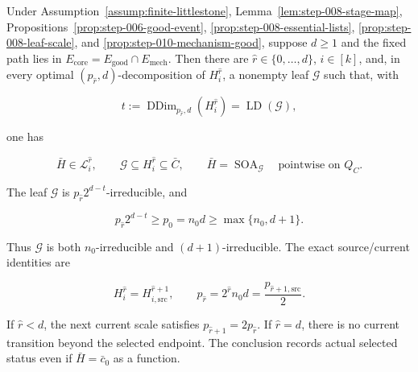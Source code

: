 \begin{proposition}\label{prop:step-012-selected-leaf}
Under Assumption~\ref{assump:finite-littlestone},
Lemma~\ref{lem:step-008-stage-map},
Propositions~\ref{prop:step-006-good-event},
\ref{prop:step-008-essential-lists},
\ref{prop:step-008-leaf-scale}, and
\ref{prop:step-010-mechanism-good}, suppose \(d\ge1\) and the fixed path
lies in \(E_{\mathrm{core}}=E_{\mathrm{good}}\cap E_{\mathrm{mech}}\).
Then there are
\(\widehat r\in\{0,\ldots,d\}\), \(i\in[k]\), and, in every optimal
\((p_{\widehat r},d)\)-decomposition of
\(H_i^{\widehat r}\), a nonempty leaf \(\mathcal G\) such that, with

\[
 t:=\operatorname{DDim}_{p_{\widehat r},d}(H_i^{\widehat r})
   =\operatorname{LD}(\mathcal G),
\tag{18}
\]

one has

\[
 \bar H\in\mathcal L_i^{\widehat r},
 \qquad
 \mathcal G\subseteq H_i^{\widehat r}\subseteq\bar C,
 \qquad
 \bar H=\operatorname{SOA}_{\mathcal G}
 \quad\text{pointwise on }Q_C.
\tag{19}
\]

The leaf \(\mathcal G\) is
\(p_{\widehat r}2^{d-t}\)-irreducible, and

\[
 p_{\widehat r}2^{d-t}
 \ge p_0=n_0d
 \ge\max\{n_0,d+1\}.
\tag{20}
\]

Thus \(\mathcal G\) is both \(n_0\)-irreducible and
\((d+1)\)-irreducible. The exact source/current identities are

\[
 H_i^{\widehat r}=H_{i,\mathrm{src}}^{\widehat r+1},
 \qquad
 p_{\widehat r}
 =2^{\widehat r}n_0d
 =\frac{p_{\widehat r+1,\mathrm{src}}}{2}.
\tag{21}
\]

If \(\widehat r<d\), the next current scale satisfies
\(p_{\widehat r+1}=2p_{\widehat r}\). If \(\widehat r=d\), there is no
current transition beyond the selected endpoint. The conclusion records
actual selected status even if \(\bar H=\bar c_0\) as a function.


\end{proposition}

